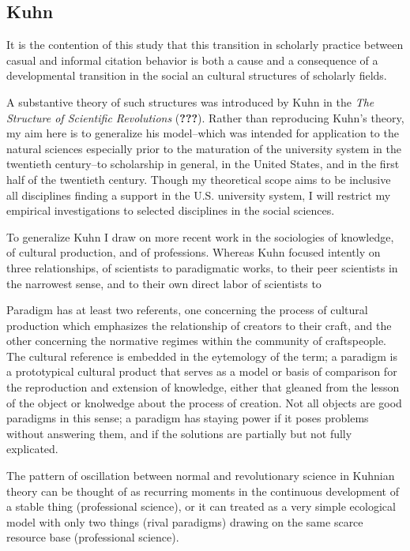 \subsection{Kuhn}\label{kuhn}

It is the contention of this study that this transition in scholarly
practice between casual and informal citation behavior is both a cause
and a consequence of a developmental transition in the social an
cultural structures of scholarly fields.

A substantive theory of such structures was introduced by Kuhn in the
\emph{The Structure of Scientific Revolutions} ({\textbf{???}}). Rather
than reproducing Kuhn's theory, my aim here is to generalize his
model--which was intended for application to the natural sciences
especially prior to the maturation of the university system in the
twentieth century--to scholarship in general, in the United States, and
in the first half of the twentieth century. Though my theoretical scope
aims to be inclusive all disciplines finding a support in the U.S.
university system, I will restrict my empirical investigations to
selected disciplines in the social sciences.

To generalize Kuhn I draw on more recent work in the sociologies of
knowledge, of cultural production, and of professions. Whereas Kuhn
focused intently on three relationships, of scientists to paradigmatic
works, to their peer scientists in the narrowest sense, and to their own
direct labor of scientists to

Paradigm has at least two referents, one concerning the process of
cultural production which emphasizes the relationship of creators to
their craft, and the other concerning the normative regimes within the
community of craftspeople. The cultural reference is embedded in the
eytemology of the term; a paradigm is a prototypical cultural product
that serves as a model or basis of comparison for the reproduction and
extension of knowledge, either that gleaned from the lesson of the
object or knolwedge about the process of creation. Not all objects are
good paradigms in this sense; a paradigm has staying power if it poses
problems without answering them, and if the solutions are partially but
not fully explicated.

The pattern of oscillation between normal and revolutionary science in
Kuhnian theory can be thought of as recurring moments in the continuous
development of a stable thing (professional science), or it can treated
as a very simple ecological model with only two things (rival paradigms)
drawing on the same scarce resource base (professional science).

